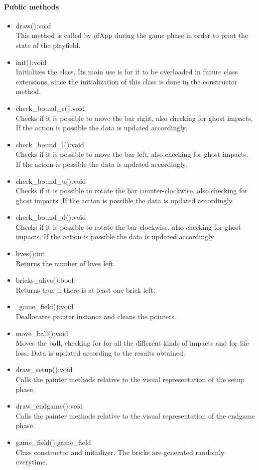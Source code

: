 \documentclass[]{article}
\begin{document}
	\paragraph{Public methods}
	\begin{itemize}
		\item draw():void \\This method is called by ofApp during the game phase in order to print the state of the playfield. 
		\item init():void \\Initializes the class. Its main use is for it to be overloaded in future class extensions, since the initialization of this class is done in the constructor method.
		\item check\_bound\_r():void\\Checks if it is possible to move the bar right, also checking for ghost impacts. If the action is possible the data is updated accordingly.
		\item check\_bound\_l():void\\Checks if it is possible to move the bar left, also checking for ghost impacts. If the action is possible the data is updated accordingly.
		\item check\_bound\_u():void\\Checks if it is possible to rotate the bar counter-clockwise, also checking for ghost impacts. If the action is possible the data is updated accordingly.
		\item check\_bound\_d():void\\Checks if it is possible to rotate the bar clockwise, also checking for ghost impacts. If the action is possible the data is updated accordingly.
		\item lives():int\\Returns the number of lives left.
		\item bricks\_alive():bool\\Returns true if there is at least one brick left.
		\item ~game\_field():void\\Deallocates painter instance and cleans the pointers.
		\item move\_ball():void\\Moves the ball, checking for for all the different kinds of impacts and for life loss. Data is updated according to the results obtained.
		\item draw\_setup():void\\Calls the painter methods relative to the visual representation of the setup phase.
		\item draw\_endgame():void\\Calls the painter methods relative to the visual representation of the endgame phase.
		\item game\_field():game\_field\\Class constructor and initializer. The bricks are generated randomly everytime.
	\end{itemize}
\newpage
\end{document}
